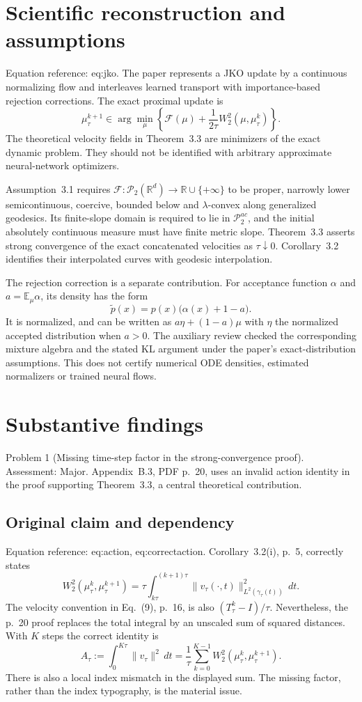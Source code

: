 \documentclass[10pt]{article}
\begin{document}
\section*{Scientific reconstruction and assumptions}
Equation reference: eq:jko. The paper represents a JKO update by a continuous normalizing flow and interleaves learned transport with importance-based rejection corrections. The exact proximal update is \[
 \mu_\tau^{k+1}\in\arg\min_\mu
 \left\{\mathcal F(\mu)+\frac{1}{2\tau}W_2^2(\mu,\mu_\tau^k)\right\}.\] The theoretical velocity fields in Theorem 3.3 are minimizers of the exact dynamic problem. They should not be identified with arbitrary approximate neural-network optimizers.\par
Assumption 3.1 requires \(\mathcal F:\mathcal P_2(\mathbb R^d)\to\mathbb R\cup\{+\infty\}\) to be proper, narrowly lower semicontinuous, coercive, bounded below and \(\lambda\)-convex along generalized geodesics. Its finite-slope domain is required to lie in \(\mathcal P_2^{ac}\), and the initial absolutely continuous measure must have finite metric slope. Theorem 3.3 asserts strong convergence of the exact concatenated velocities as \(\tau\downarrow0\). Corollary 3.2 identifies their interpolated curves with geodesic interpolation.\par
The rejection correction is a separate contribution. For acceptance function \(\alpha\) and \(a=\mathbb E_\mu\alpha\), its density has the form \[\widetilde p(x)=p(x)\bigl(\alpha(x)+1-a\bigr).\] It is normalized, and can be written as \(a\eta+(1-a)\mu\) with \(\eta\) the normalized accepted distribution when \(a>0\). The auxiliary review checked the corresponding mixture algebra and the stated KL argument under the paper’s exact-distribution assumptions. This does not certify numerical ODE densities, estimated normalizers or trained neural flows.\par
\section*{Substantive findings}
Problem 1 (Missing time-step factor in the strong-convergence proof).  Assessment: Major. Appendix B.3, PDF p. 20, uses an invalid action identity in the proof supporting Theorem 3.3, a central theoretical contribution.\par
\subsection*{Original claim and dependency}
Equation reference: eq:action, eq:correctaction. Corollary 3.2(i), p. 5, correctly states \[
 W_2^2(\mu_\tau^k,\mu_\tau^{k+1})
 =\tau\int_{k\tau}^{(k+1)\tau}
     \|v_\tau(\cdot,t)\|_{L^2(\gamma_\tau(t))}^2\,dt .\] The velocity convention in Eq. (9), p. 16, is also \((T_\tau^k-I)/\tau\). Nevertheless, the p. 20 proof replaces the total integral by an unscaled sum of squared distances. With \(K\) steps the correct identity is \[
 A_\tau:=\int_0^{K\tau}\|v_\tau\|^2\,dt
 =\frac1\tau\sum_{k=0}^{K-1}
       W_2^2(\mu_\tau^k,\mu_\tau^{k+1}).\] There is also a local index mismatch in the displayed sum. The missing factor, rather than the index typography, is the material issue.\par
\end{document}
